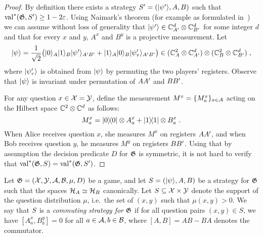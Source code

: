 \begin{proof}
  By definition there exists a strategy $\strategy'= (\ket{\psi'},A,B)$ such
  that $\val^*(\game,\strategy')\geq 1-2\eps$.
Using Naimark's theorem (for example as formulated in~\cite[Theorem 4.2]{NW19}) we can assume
without loss of generality that $\ket{\psi'}\in\C_{\alice'}^d\otimes \C_{\bob'}^d$ for some integer $d$
  and that for every $x$ and $y$, $A^x$ and $B^y$ is a projective measurement.
  Let
  \[
    \ket{\psi} = \frac{1}{\sqrt{2}} \big( \ket{0}_\alice \ket{1}_\bob
    \ket{\psi'}_{\alice'\bob'} + \ket{1}_\alice \ket{0}_\bob
    \ket{\psi'_\tau}_{\alice'\bob'}\big) \in (\C_{\alice}^2 \otimes
    \C_{\alice'}^d) \otimes (\C_\bob^2 \otimes \C_{\bob'}^d)\;,
  \]
  where $\ket{\psi'_\tau}$ is obtained from $\ket{\psi}$ by permuting the two
  players' registers.
  Observe that $\ket{\psi}$ is invariant under permutation of $\alice\alice'$
  and $\bob\bob'$.
  
  For any question $x\in \cal{X}=\cal{Y}$, define the measurement $M^x = \{M^x_a\}_{a \in \cal{A}}$
  acting on the Hilbert space $\C^2 \otimes \C^d$ as follows:
  \[
  	M^x_a = \ketbra{0}{0} \otimes A^x_a + \ketbra{1}{1} \otimes B^x_a \;.
  \]
  When Alice receives question $x$, she measures $M^x$ on registers $\alice \alice'$, and when Bob receives 
  question $y$, he measures $M^y$ on registers $\bob \bob'$.
  Using that by assumption the decision predicate $D$ for $\game$ is symmetric,
  it is not hard to verify that $\val^*(\game,\strategy) =
  \val^*(\game,\strategy')$.
\end{proof}

\begin{definition}
  \label{def:comm-strategy}
  Let $\game = (\cal{X}, \cal{Y}, \cal{A}, \cal{B}, \mu, D)$ be a game, and let
  $\strategy = (\ket{\psi}, A, B)$ be a strategy for $\game$ such that the
  spaces $\mH_A \simeq \mH_B$ canonically.
  Let $S \subseteq \cal{X} \times \cal{Y}$ denote the support of the question
  distribution $\mu$, i.e.\ the set of $(x,y)$ such that $\mu(x,y)>0$.
  We say that $\strategy$ is a \emph{commuting strategy for $\game$} if for all
  question pairs $(x, y) \in S$, we have $[A^x_a, B^y_b] = 0$ 
  for all $a
  \in \cal{A}, b \in \cal{B}$, where $[A, B] = AB - BA$ denotes the commutator.
\end{definition}


